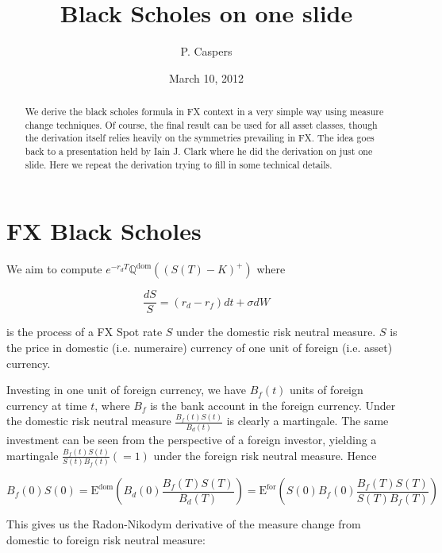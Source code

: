 \documentclass{amsart}
\theoremstyle{plain}
\numberwithin{equation}{section}
\begin{document}
\title[Black Scholes on one slide]{Black Scholes on one slide}
\author{P. Caspers}
\date{March 10, 2012}
\begin{abstract}
We derive the black scholes formula in FX context in a very simple way using measure change techniques. Of course, the final result can be used for all asset classes, though the derivation itself relies heavily on the symmetries prevailing in FX. The idea goes back to a presentation held by Iain J. Clark where he did the derivation on just one slide. Here we repeat the derivation trying to fill in some technical details.
\end{abstract}

\maketitle


\section{FX Black Scholes}

We aim to compute $e^{-r_dT}\mathrm{\mathbb{Q}^{dom}}((S(T)-K)^+)$ where

\begin{equation} \label{bsprocess}
\frac{dS}{S} = (r_d - r_f) dt + \sigma dW
\end{equation}

is the process of a FX Spot rate $S$ under the domestic risk neutral measure. $S$ is the price in domestic (i.e. numeraire) currency of one unit of foreign (i.e. asset) currency. 

Investing in one unit of foreign currency, we have $B_f(t)$ units of foreign currency at time $t$, where $B_f$ is the bank account in the foreign currency. Under the domestic risk neutral measure $\frac{B_f(t)S(t)}{B_d(t)}$ is clearly a martingale. The same investment can be seen from the perspective of a foreign investor, yielding a martingale $\frac{B_f(t)S(t)}{S(t)B_f(t)} (=1)$ under the foreign risk neutral measure. Hence

\begin{equation}
B_f(0)S(0) = \mathrm{E^{dom}}\left( B_d(0) \frac{B_f(T)S(T)}{B_d(T)} \right) = \mathrm{E^{for}}\left( S(0)B_f(0) \frac{B_f(T)S(T)}{S(T)B_f(T)}\right)
\end{equation}

This gives us the Radon-Nikodym derivative of the measure change from domestic to foreign risk neutral measure:
\end{document}
